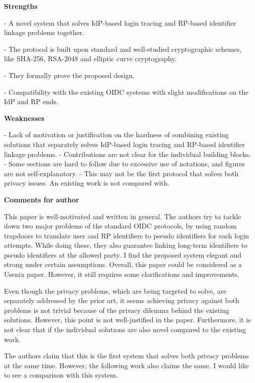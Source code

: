 \documentclass[letterpaper,onecolumn,10pt]{article}
\begin{document}
\vspace{1mm}\noindent\textbf{Strengths}


-	A novel system that solves IdP-based login tracing and RP-based identifier linkage problems together.

-	The protocol is built upon standard and well-studied cryptographic schemes, like SHA-256, RSA-2048 and elliptic curve cryptography.

-	They formally prove the proposed design.

-	Compatibility with the existing OIDC systems with slight modifications on the IdP and RP ends.

\vspace{1mm}\noindent\textbf{Weaknesses}


-	Lack of motivation or justification on the hardness of combining existing solutions that separately solves IdP-based login tracing and RP-based identifier linkage problems.
-	Contributions are not clear for the individual building blocks.
-	Some sections are hard to follow due to excessive use of notations, and figures are not self-explanatory.  
-	This may not be the first protocol that solves both privacy issues. An existing work is not compared with.

\vspace{1mm}\noindent\textbf{Comments for author}


This paper is well-motivated and written in general. The authors try to tackle down two major problems of the standard OIDC protocols, by using random trapdoors to translate user and RP identifiers to pseudo identifiers for each login attempts. While doing these, they also guarantee linking long-term identifiers to pseudo identifiers at the allowed party. I find the proposed system elegant and strong under certain assumptions. Overall, this paper could be considered as a Usenix paper. However, it still requires some clarifications and improvements.

Even though the privacy problems, which are being targeted to solve, are separately addressed by the prior art, it seems achieving privacy against both problems is not trivial because of the privacy dilemma behind the existing solutions. However, this point is not well-justified in the paper. Furthermore, it is not clear that if the individual solutions are also novel compared to the existing work.

The authors claim that this is the first system that solves both privacy problems at the same time. However, the following work also claims the same. I would like to see a comparison with this system.
\end{document}

